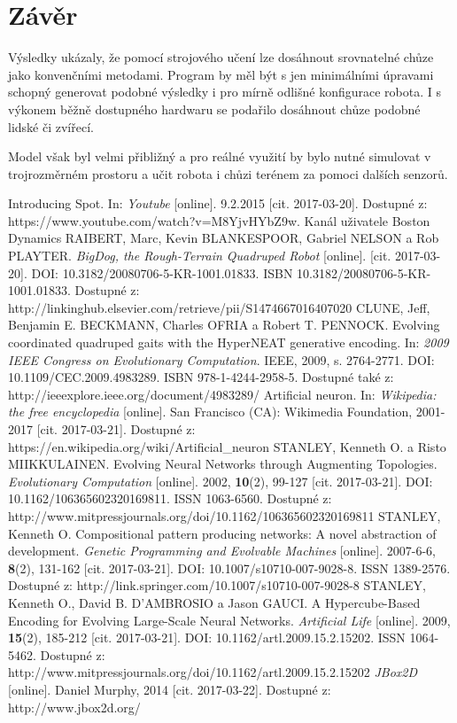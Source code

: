 \documentclass[a4]{article}
\begin{document}
\section{Závěr} 
Výsledky ukázaly, že pomocí strojového učení lze dosáhnout srovnatelné chůze jako konvenčními metodami. Program by měl být s jen minimálními úpravami schopný generovat podobné výsledky i pro mírně odlišné konfigurace robota. I s výkonem běžně dostupného hardwaru se podařilo dosáhnout chůze podobné lidské či zvířecí. \par Model však byl velmi přibližný a pro reálné využití by bylo nutné simulovat v trojrozměrném prostoru a učit robota i chůzi terénem za pomoci dalších senzorů.
\begin{thebibliography}{8}
Introducing Spot. In: \textit{Youtube} [online]. 9.2.2015 [cit. 2017-03-20]. Dostupné z: https://www.youtube.com/watch?v=M8YjvHYbZ9w. Kanál uživatele Boston Dynamics
RAIBERT, Marc, Kevin BLANKESPOOR, Gabriel NELSON a Rob PLAYTER. \textit{BigDog, the Rough-Terrain Quadruped Robot} [online]. [cit. 2017-03-20]. DOI: 10.3182/20080706-5-KR-1001.01833. ISBN 10.3182/20080706-5-KR-1001.01833. Dostupné z: http://linkinghub.elsevier.com/retrieve/pii/S1474667016407020
CLUNE, Jeff, Benjamin E. BECKMANN, Charles OFRIA a Robert T. PENNOCK. Evolving coordinated quadruped gaits with the HyperNEAT generative encoding. In: \textit{2009 IEEE Congress on Evolutionary Computation}. IEEE, 2009, s. 2764-2771. DOI: 10.1109/CEC.2009.4983289. ISBN 978-1-4244-2958-5. Dostupné také z: http://ieeexplore.ieee.org/document/4983289/
Artificial neuron. In: \textit{Wikipedia: the free encyclopedia} [online]. San Francisco (CA): Wikimedia Foundation, 2001-2017 [cit. 2017-03-21]. Dostupné z: https://en.wikipedia.org/wiki/Artificial\_neuron
STANLEY, Kenneth O. a Risto MIIKKULAINEN. Evolving Neural Networks through Augmenting Topologies. \emph{Evolutionary Computation} [online]. 2002, \textbf{10}(2), 99-127 [cit. 2017-03-21]. DOI: 10.1162/106365602320169811. ISSN 1063-6560. Dostupné z: http://www.mitpressjournals.org/doi/10.1162/106365602320169811
STANLEY, Kenneth O. Compositional pattern producing networks: A novel abstraction of development. \emph{Genetic Programming and Evolvable Machines} [online]. 2007-6-6, \textbf{8}(2), 131-162 [cit. 2017-03-21]. DOI: 10.1007/s10710-007-9028-8. ISSN 1389-2576. Dostupné z: http://link.springer.com/10.1007/s10710-007-9028-8
STANLEY, Kenneth O., David B. D'AMBROSIO a Jason GAUCI. A Hypercube-Based Encoding for Evolving Large-Scale Neural Networks. \textit{Artificial Life} [online]. 2009, \textbf{15}(2), 185-212 [cit. 2017-03-21]. DOI: 10.1162/artl.2009.15.2.15202. ISSN 1064-5462. Dostupné z: http://www.mitpressjournals.org/doi/10.1162/artl.2009.15.2.15202
\textit{JBox2D} [online]. Daniel Murphy, 2014 [cit. 2017-03-22]. Dostupné z: http://www.jbox2d.org/
\end{thebibliography}
\end{document}
